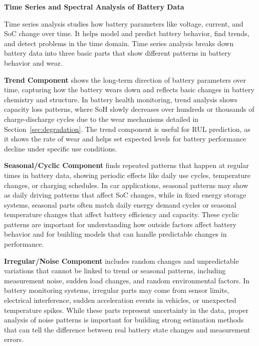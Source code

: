 
\textbf{Time Series and Spectral Analysis of Battery Data}

Time series analysis studies how battery parameters like voltage, current, and SoC change over time. It helps model and predict battery behavior, find trends, and detect problems in the time domain. Time series analysis breaks down battery data into three basic parts that show different patterns in battery behavior and wear.

\textbf{Trend Component} shows the long-term direction of battery parameters over time, capturing how the battery wears down and reflects basic changes in battery chemistry and structure. In battery health monitoring, trend analysis shows capacity loss patterns, where SoH slowly decreases over hundreds or thousands of charge-discharge cycles due to the wear mechanisms detailed in Section~\ref{sec:degradation}. The trend component is useful for RUL prediction, as it shows the rate of wear and helps set expected levels for battery performance decline under specific use conditions.

\textbf{Seasonal/Cyclic Component} finds repeated patterns that happen at regular times in battery data, showing periodic effects like daily use cycles, temperature changes, or charging schedules. In car applications, seasonal patterns may show as daily driving patterns that affect SoC changes, while in fixed energy storage systems, seasonal parts often match daily energy demand cycles or seasonal temperature changes that affect battery efficiency and capacity. These cyclic patterns are important for understanding how outside factors affect battery behavior and for building models that can handle predictable changes in performance.

\textbf{Irregular/Noise Component} includes random changes and unpredictable variations that cannot be linked to trend or seasonal patterns, including measurement noise, sudden load changes, and random environmental factors. In battery monitoring systems, irregular parts may come from sensor limits, electrical interference, sudden acceleration events in vehicles, or unexpected temperature spikes. While these parts represent uncertainty in the data, proper analysis of noise patterns is important for building strong estimation methods that can tell the difference between real battery state changes and measurement errors.

